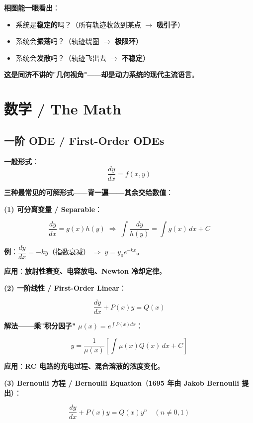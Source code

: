 \textbf{相图能一眼看出}：

\begin{itemize}
\item 系统是\textbf{稳定的}吗？（所有轨迹收敛到某点 $\to$ \textbf{吸引子}）
\item 系统会\textbf{振荡}吗？（轨迹绕圈 $\to$ \textbf{极限环}）
\item 系统会\textbf{发散}吗？（轨迹飞出去 $\to$ \textbf{不稳定}）
\end{itemize}

\textbf{这是同济不讲的"几何视角"}——\textbf{却是动力系统的现代主流语言}。

\section{数学 / The Math}

\subsection{一阶 ODE / First-Order ODEs}

\textbf{一般形式}：
\[
\frac{dy}{dx} = f(x, y)
\]

\textbf{三种最常见的可解形式}——\textbf{背一遍——其余交给数值}：

\medskip

\textbf{(1) 可分离变量 / Separable}：

\[
\frac{dy}{dx} = g(x) h(y) \;\Longrightarrow\; \int \frac{dy}{h(y)} = \int g(x) \, dx + C
\]

\textbf{例}：$\dfrac{dy}{dx} = -k y$（指数衰减）$\;\Rightarrow\;y = y_0 e^{-kx}$。

\textbf{应用}：\textbf{放射性衰变、电容放电、Newton 冷却定律}。

\medskip

\textbf{(2) 一阶线性 / First-Order Linear}：

\[
\frac{dy}{dx} + P(x) y = Q(x)
\]

\textbf{解法——乘"积分因子" $\mu(x) = e^{\int P(x) dx}$}：

\[
y = \frac{1}{\mu(x)}\left[\int \mu(x) Q(x) \, dx + C\right]
\]

\textbf{应用}：\textbf{RC 电路的充电过程、混合溶液的浓度变化}。

\medskip

\textbf{(3) Bernoulli 方程 / Bernoulli Equation}（\textbf{1695 年由 Jakob Bernoulli 提出}）：

\[
\frac{dy}{dx} + P(x) y = Q(x) y^n \quad (n \neq 0, 1)
\]

